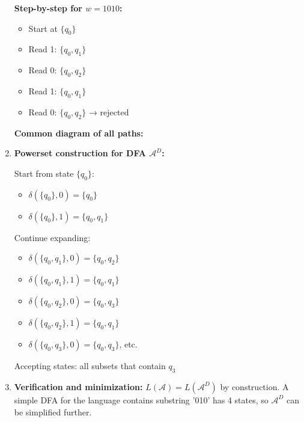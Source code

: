 \documentclass{article}
\theoremstyle{theorem}
\theoremstyle{definition}
\theoremstyle{remark}
\begin{document}
\begin{enumerate}
    \textbf{Step-by-step for $w = 1010$:}
    \begin{itemize}
        \item Start at $\{q_0\}$
        \item Read 1: $\{q_0, q_1\}$
        \item Read 0: $\{q_0, q_2\}$
        \item Read 1: $\{q_0, q_1\}$
        \item Read 0: $\{q_0, q_2\}$ → rejected
    \end{itemize}

    \textbf{Common diagram of all paths:}

    \begin{center}
    \end{center}

    \item \textbf{Powerset construction for DFA $\mathcal{A}^D$:}

    Start from state $\{q_0\}$:
    \begin{itemize}
        \item $\delta(\{q_0\}, 0) = \{q_0\}$
        \item $\delta(\{q_0\}, 1) = \{q_0, q_1\}$
    \end{itemize}
    Continue expanding:
    \begin{itemize}
        \item $\delta(\{q_0, q_1\}, 0) = \{q_0, q_2\}$
        \item $\delta(\{q_0, q_1\}, 1) = \{q_0, q_1\}$
        \item $\delta(\{q_0, q_2\}, 0) = \{q_0, q_3\}$
        \item $\delta(\{q_0, q_2\}, 1) = \{q_0, q_1\}$
        \item $\delta(\{q_0, q_3\}, 0) = \{q_0, q_3\}$, etc.
    \end{itemize}
    Accepting states: all subsets that contain $q_3$

    \item \textbf{Verification and minimization:}  
    $L(\mathcal{A}) = L(\mathcal{A}^D)$ by construction. A simple DFA for the language contains substring '010' has 4 states, so $\mathcal{A}^D$ can be simplified further.
\end{enumerate}
\end{document}
